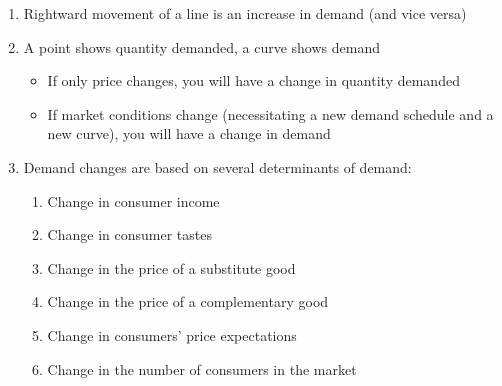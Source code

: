 \documentclass[12pt]{article}
\begin{document}
\begin{enumerate}
  \item Rightward movement of a line is an increase in demand (and vice versa)

  \item A point shows quantity demanded, a curve shows demand

    \begin{itemize}

      \item If only price changes, you will have a change in quantity demanded

      \item If market conditions change (necessitating a new demand schedule and a new curve), you will have a change in demand

    \end{itemize}

    \newpage

  \item Demand changes are based on several determinants of demand:

    \begin{enumerate}

      \item Change in consumer income

      \item Change in consumer tastes

      \item Change in the price of a substitute good

      \item Change in the price of a complementary good

      \item Change in consumers' price expectations

      \item Change in the number of consumers in the market

    \end{enumerate}
    
    \begin{center}
    \end{center}

\end{enumerate}
\end{document}
